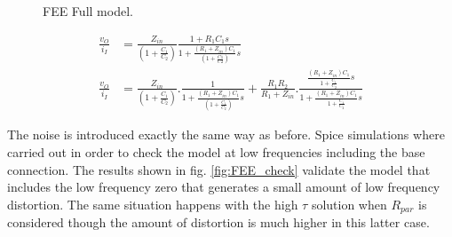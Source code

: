 \documentclass[a4paper,11pt]{report}
\begin{document}
\begin{figure}[!tbp]
  \centering
  \hfill
  \caption{FEE Full model.}
  \label{fig:FEE_PMT}
\end{figure}

\begin{align}
\frac{v_O}{i_I} &= \frac{Z_{in}}{(1+\frac{C_1}{C_2})}\frac{1+R_1C_1s}{1+\frac{(R_1+Z_{in})C_1}{(1+\frac{C1}{C2})}s} \label{eq:full_fee}\\ 
\frac{v_O}{i_I} &= \frac{Z_{in}}{(1+\frac{C_1}{C_2})}.\frac{1}{1+\frac{(R_1+Z_{in})C_1}{(1+\frac{C_1}{C_2})}s}+\frac{R_1R_2}{R_1+Z_{in}}.\frac{\frac{(R_1+Z_{in})C_1}{1+\frac{C_1}{C_2}}s}{1+\frac{(R_1+Z_{in})C_1}{1+\frac{C_1}{C_2}}s}
\end{align}

The noise is introduced exactly the same way as before. Spice simulations where carried out in order to check the model at low frequencies including the base connection. The results shown in fig. \ref{fig:FEE_check} validate the model that includes the low frequency zero that generates a small amount of low frequency distortion. The same situation happens with the high $\tau$ solution when $R_{par}$ is considered though the amount of distortion is much higher in this latter case. 
\end{document}
